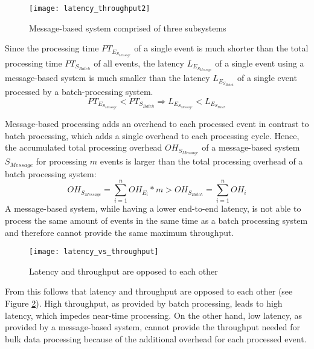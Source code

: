 \begin{figure}[h!]
	\centering
	\texttt{[image: latency\_throughput2]}
	\caption{Message-based system comprised of three subsystems}
	\label{fig:message_based_latency}
\end{figure}

Since the processing time $PT_{E_{S_{Message}}}$ of a single event is much shorter than the total processing time $PT_{S_{Batch}}$ of all events, the latency $L_{E_{S_{Message}}}$ of a single event using a message-based system is much smaller than the latency $L_{E_{S_{Batch}}}$ of a single event processed by a batch-processing system.
\begin{displaymath}
PT_{E_{S_{Message}}} < PT_{S_{Batch}} \Rightarrow L_{E_{S_{Message}}} < L_{E_{S_{Batch}}}
\end{displaymath}

Message-based processing adds an overhead to each processed event in contrast to batch processing, which adds a single overhead to each processing cycle. Hence, the accumulated total processing overhead $OH_{S_{Message}}$ of a message-based system $S_{Message}$ for processing $m$ events is larger than the total processing overhead of a batch processing system:
\begin{displaymath}
OH_{S_{Message}} = \sum_{i=1}^n OH_{E_i} * m > OH_{S_{Batch}} = \sum_{i=1}^n OH_i
\end{displaymath}
A message-based system, while having a lower end-to-end latency, is not able to process the same amount of events in the same time as a batch processing system and therefore cannot provide the same maximum throughput.

\begin{figure}[h!]
	\centering
	\texttt{[image: latency\_vs\_throughput]}
	\caption{Latency and throughput are opposed to each other}
	\label{fig:latency_vs_throughput}
\end{figure}

From this follows that latency and throughput are opposed to each other (see Figure \ref{fig:latency_vs_throughput}). High throughput, as provided by batch processing, leads to high latency, which impedes near-time processing. On the other hand, low latency, as provided by a message-based system, cannot provide the throughput needed for bulk data processing because of the additional overhead for each processed event.

